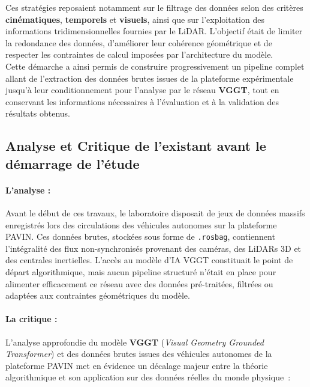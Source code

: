 \documentclass[12pt,a4paper,oneside]{report}
\begin{document}
\hspace*{.3cm}Ces stratégies reposaient notamment sur le filtrage des données selon des critères \textbf{cinématiques}, \textbf{temporels} et \textbf{visuels}, ainsi que sur l'exploitation des informations tridimensionnelles fournies par le LiDAR. L'objectif était de limiter la redondance des données, d'améliorer leur cohérence géométrique et de respecter les contraintes de calcul imposées par l'architecture du modèle.\\
\hspace*{.3cm}Cette démarche a ainsi permis de construire progressivement un pipeline complet allant de l'extraction des données brutes issues de la plateforme expérimentale jusqu'à leur conditionnement pour l'analyse par le réseau \textbf{VGGT}, tout en conservant les informations nécessaires à l'évaluation et à la validation des résultats obtenus.


\subsection{Analyse et Critique de l'existant avant le démarrage de l'étude}

\paragraph{\large{}\selectfont L'analyse :}
Avant le début de ces travaux, le laboratoire disposait de jeux de données massifs enregistrés lors des circulations des véhicules autonomes sur la plateforme PAVIN. Ces données brutes, stockées sous forme de \texttt{.rosbag}, contiennent l'intégralité des flux non-synchronisés provenant des caméras, des LiDARs 3D et des centrales inertielles. L'accès au modèle d'IA VGGT constituait le point de départ algorithmique, mais aucun pipeline structuré n'était en place pour alimenter efficacement ce réseau avec des données pré-traitées, filtrées ou adaptées aux contraintes géométriques du modèle.

\paragraph{\large{}\selectfont La critique :}
\label{subsec:critique_vggt}

L'analyse approfondie du modèle \textbf{VGGT} (\textit{Visual Geometry Grounded Transformer}) et des données brutes issues des véhicules autonomes de la plateforme PAVIN met en évidence un décalage majeur entre la théorie algorithmique et son application sur des données réelles du monde physique~:\par\bigskip
\end{document}
